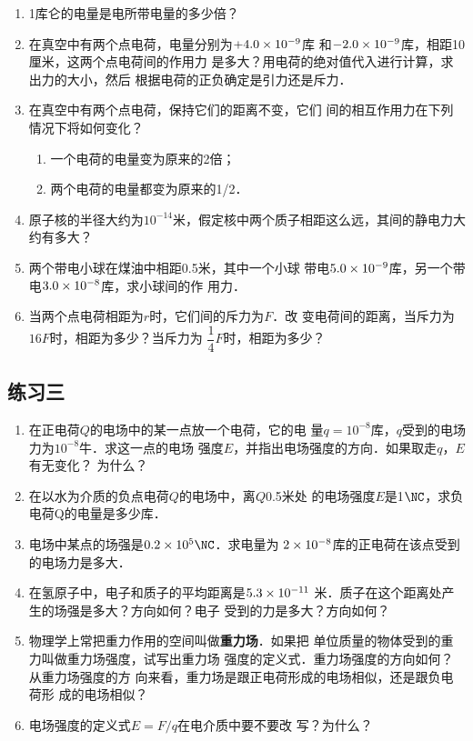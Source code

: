 \begin{enumerate}
	\item 1库仑的电量是电所带电量的多少倍？
	\item 在真空中有两个点电荷，电量分别为$+4.0\times10^{-9}$库
和$-2.0\times10^{-9}$库，相距10厘米，这两个点电荷间的作用力
是多大？用电荷的绝对值代入进行计算，求出力的大小，然后
根据电荷的正负确定是引力还是斥力．
\item 在真空中有两个点电荷，保持它们的距离不变，它们
间的相互作用力在下列情况下将如何变化？
\begin{enumerate}
	\item 一个电荷的电量变为原来的2倍；
	\item 两个电荷的电量都变为原来的1/2．
\end{enumerate}
\item 原子核的半径大约为$10^{-14}$米，假定核中两个质子相距这么远，其间的静电力大约有多大？
\item 两个带电小球在煤油中相距0.5米，其中一个小球
带电$5.0\times10^{-9}$库，另一个带电$3.0\times10^{-8}$库，求小球间的作
用力．
\item 当两个点电荷相距为$r$时，它们间的斥力为$F$．改
变电荷间的距离，当斥力为$16F$时，相距为多少？当斥力为
$\dfrac{1}{4}F$时，相距为多少？
\end{enumerate}

\subsection{练习三}

\begin{enumerate}
	\item 在正电荷$Q$的电场中的某一点放一个电荷，它的电
	量$q=10^{-8}$库，$q$受到的电场力为$10^{-8}$牛．求这一点的电场
	强度$E$，并指出电场强度的方向．如果取走$q$，$E$有无变化？
	为什么？
	\item 在以水为介质的负点电荷$Q$的电场中，离$Q$0.5米处
	的电场强度$E$是1$\NC$，求负电荷Q的电量是多少库．
	\item 电场中某点的场强是$0.2\x10^5\NC$．求电量为
	$2\times10^{-8}$库的正电荷在该点受到的电场力是多大．
	\item 在氢原子中，电子和质子的平均距离是$5.3\times10^{-11}$
	米．质子在这个距离处产生的场强是多大？方向如何？电子
	受到的力是多大？方向如何？
	\item 物理学上常把重力作用的空间叫做\textbf{重力场}．如果把
	单位质量的物体受到的重力叫做重力场强度，试写出重力场
	强度的定义式．重力场强度的方向如何？从重力场强度的方
	向来看，重力场是跟正电荷形成的电场相似，还是跟负电荷形
成的电场相似？
\item 电场强度的定义式$E=F/q$在电介质中要不要改
写？为什么？
\end{enumerate}


